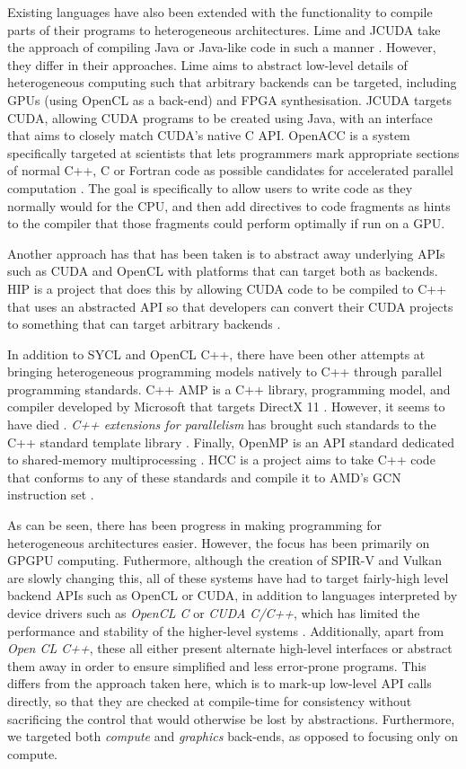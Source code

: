 \documentclass[a4paper,12pt,twoside,openright]{report}
\begin{document}
Existing languages have also been extended with the functionality to compile
parts of their programs to heterogeneous architectures. Lime and JCUDA take the
approach of compiling Java or Java-like code in such a manner \cite{Lime2010}
\cite{Lime2012} \cite{JCUDA2009}. However, they differ in their approaches.
Lime aims to abstract low-level details of heterogeneous computing such that
arbitrary backends can be targeted, including GPUs (using OpenCL as a back-end)
and FPGA synthesisation. JCUDA targets CUDA, allowing CUDA programs to be
created using Java, with an interface that aims to closely match CUDA's native
C API. OpenACC is a system specifically targeted at scientists that lets
programmers mark appropriate sections of normal C++, C or Fortran code as
possible candidates for accelerated parallel computation \cite{OpenACC}. The
goal is specifically to allow users to write code as they normally would for
the CPU, and then add directives to code fragments as hints to the compiler
that those fragments could perform optimally if run on a GPU.

Another approach has that has been taken is to abstract away underlying APIs
such as CUDA and OpenCL with platforms that can target both as backends. HIP is
a project that does this by allowing CUDA code to be compiled to C++ that uses
an abstracted API so that developers can convert their CUDA projects to
something that can target arbitrary backends \cite{HIP}.

In addition to SYCL and OpenCL C++, there have been other attempts at bringing
heterogeneous programming models natively to C++ through parallel programming
standards. C++ AMP is a C++ library, programming model, and compiler developed
by Microsoft that targets DirectX 11 \cite{CAMP}. However, it seems to have
died \cite{CAMPFail1} \cite{CAMPFail2}. \textit{C++ extensions for parallelism}
has brought such standards to the C++ standard template library
\cite{CPPParallelism}. Finally, OpenMP is an API standard dedicated to
shared-memory multiprocessing \cite{OpenMP}. HCC is a project aims to take C++
code that conforms to any of these standards and compile it to AMD's GCN
instruction set \cite{HCC}.

As can be seen, there has been progress in making programming for heterogeneous
architectures easier. However, the focus has been primarily on GPGPU computing.
Futhermore, although the creation of SPIR-V and Vulkan are slowly changing
this, all of these systems have had to target fairly-high level backend APIs
such as OpenCL or CUDA, in addition to languages interpreted by device drivers
such as \textit{OpenCL C} or \textit{CUDA C/C++}, which has limited the
performance and stability of the higher-level systems \cite{GLFuzz}.
Additionally, apart from \textit{Open CL C++}, these all either present
alternate high-level interfaces or abstract them away in order to ensure
simplified and less error-prone programs. This differs from the approach taken
here, which is to mark-up low-level API calls directly, so that they are
checked at compile-time for consistency without sacrificing the control that
would otherwise be lost by abstractions. Furthermore, we targeted both
\textit{compute} and \textit{graphics} back-ends, as opposed to focusing only
on compute.
\end{document}
